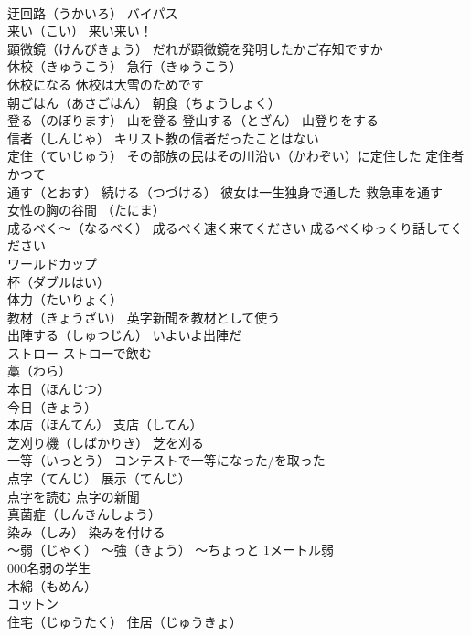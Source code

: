 \documentclass[8pt]{extreport}
\begin{document}
\begin{CJK}{UTF8}{min}
\\	迂回路（うかいろ） バイパス
\\	来い（こい） 来い来い！
\\	顕微鏡（けんびきょう） だれが顕微鏡を発明したかご存知ですか
\\	休校（きゅうこう） 急行（きゅうこう）
\\	休校になる 休校は大雪のためです
\\	朝ごはん（あさごはん） 朝食（ちょうしょく）
\\	登る（のぼります） 山を登る 登山する（とざん） 山登りをする
\\	信者（しんじゃ） キリスト教の信者だったことはない
\\	定住（ていじゅう） その部族の民はその川沿い（かわぞい）に定住した 定住者
\\	かつて
\\	通す（とおす） 続ける（つづける） 彼女は一生独身で通した 救急車を通す
\\	女性の胸の谷間 （たにま）
\\	成るべく～（なるべく） 成るべく速く来てください 成るべくゆっくり話してください
\\	ワールドカップ 
\\	杯（ダブルはい）
\\	体力（たいりょく）
\\	教材（きょうざい） 英字新聞を教材として使う
\\	出陣する（しゅつじん） いよいよ出陣だ
\\	ストロー ストローで飲む 
\\	藁（わら）
\\	本日（ほんじつ） 
\\	今日（きょう）
\\	本店（ほんてん） 支店（してん）
\\	芝刈り機（しばかりき） 芝を刈る
\\	一等（いっとう） コンテストで一等になった/を取った
\\	点字（てんじ） 展示（てんじ） 
\\	点字を読む 点字の新聞
\\	真菌症（しんきんしょう）
\\	染み（しみ） 染みを付ける
\\	～弱（じゃく） ～強（きょう） ～ちょっと 1メートル弱 
\\	000名弱の学生
\\	木綿（もめん） 
\\	コットン
\\	住宅（じゅうたく） 住居（じゅうきょ） 

\end{CJK}
\end{document}
